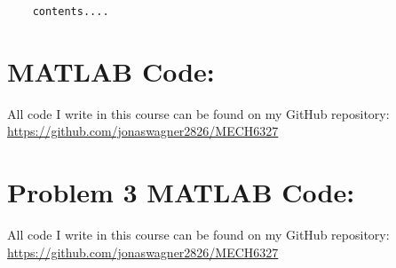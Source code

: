 \documentclass[letter]{article}
\begin{document}
\begin{Verbatim}
	contents....
\end{Verbatim}















\newpage
\appendix
\section{MATLAB Code:}\label{apx:matlab}
All code I write in this course can be found on my GitHub repository:\\
\href{https://github.com/jonaswagner2826/MECH6313}{https://github.com/jonaswagner2826/MECH6327}
%


\newpage
\section{Problem 3 MATLAB Code:}\label{apx:pblm3_matlab}
All code I write in this course can be found on my GitHub repository:\\
\href{https://github.com/jonaswagner2826/MECH6313}{https://github.com/jonaswagner2826/MECH6327}
%
\end{document}
